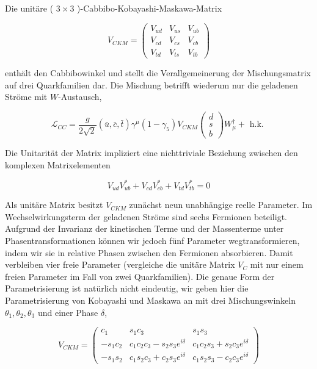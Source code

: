 \documentclass[10pt, letterpaper]{article}
\begin{document}
Die unitäre ( $3 \times 3$ )-Cabbibo-Kobayashi-Maskawa-Matrix

$$
V_{C K M}=\left(\begin{array}{lll}
V_{u d} & V_{u s} & V_{u b} \\
V_{c d} & V_{c s} & V_{c b} \\
V_{t d} & V_{t s} & V_{t b}
\end{array}\right)
$$

enthält den Cabbibowinkel und stellt die Verallgemeinerung der Mischungsmatrix auf drei Quarkfamilien dar. Die Mischung betrifft wiederum nur die geladenen Ströme mit $W$-Austausch,

$$
\mathscr{L}_{C C}=\frac{g}{2 \sqrt{2}}(\bar{u}, \bar{c}, \bar{t}) \gamma^{\mu}\left(1-\gamma_{5}\right) V_{C K M}\left(\begin{array}{l}
d \\
s \\
b
\end{array}\right) W_{\mu}^{\dagger}+\text { h.k. }
$$

Die Unitarität der Matrix impliziert eine nichttriviale Beziehung zwischen den komplexen Matrixelementen

$$
V_{u d} V_{u b}^{*}+V_{c d} V_{c b}^{*}+V_{t d} V_{t b}^{*}=0
$$

Als unitäre Matrix besitzt $V_{C K M}$ zunächst neun unabhängige reelle Parameter. Im Wechselwirkungsterm der geladenen Ströme sind sechs Fermionen beteiligt. Aufgrund der Invarianz der kinetischen Terme und der Massenterme unter Phasentransformationen können wir jedoch fünf Parameter wegtransformieren, indem wir sie in relative Phasen zwischen den Fermionen absorbieren. Damit verbleiben vier freie Parameter (vergleiche die unitäre Matrix $V_{C}$ mit nur einem freien Parameter im Fall von zwei Quarkfamilien). Die genaue Form der Parametrisierung ist natürlich nicht eindeutig, wir geben hier die Parametrisierung von Kobayashi und Maskawa an mit drei Mischungswinkeln $\theta_{1}, \theta_{2}, \theta_{3}$ und einer Phase $\delta$,

$$
V_{C K M}=\left(\begin{array}{ccc}
c_{1} & s_{1} c_{3} & s_{1} s_{3} \\
-s_{1} c_{2} & c_{1} c_{2} c_{3}-s_{2} s_{3} e^{i \delta} & c_{1} c_{2} s_{3}+s_{2} c_{3} e^{i \delta} \\
-s_{1} s_{2} & c_{1} s_{2} c_{3}+c_{2} s_{3} e^{i \delta} & c_{1} s_{2} s_{3}-c_{2} c_{3} e^{i \delta}
\end{array}\right)
$$
\end{document}
